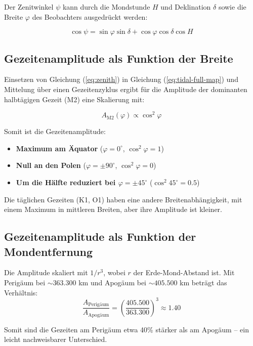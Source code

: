 \documentclass[12pt,a4paper]{article}
\theoremstyle{remark}
\begin{document}
	Der Zenitwinkel \(\psi\) kann durch die Mondstunde \(H\) und Deklination \(\delta\) sowie die Breite \(\varphi\) des Beobachters ausgedrückt werden:
	
	\begin{equation}
		\cos\psi = \sin\varphi \sin\delta + \cos\varphi \cos\delta \cos H
		\label{eq:zenith}
	\end{equation}
	
	\subsection{Gezeitenamplitude als Funktion der Breite}
	
	Einsetzen von Gleichung (\ref{eq:zenith}) in Gleichung (\ref{eq:tidal-full-map}) und Mittelung über einen Gezeitenzyklus ergibt für die Amplitude der dominanten halbtägigen Gezeit (M2) eine Skalierung mit:
	
	\begin{equation}
		A_{\text{M2}}(\varphi) \propto \cos^2\varphi
		\label{eq:amplitude-latitude}
	\end{equation}
	
	Somit ist die Gezeitenamplitude:
	\begin{itemize}
		\item \textbf{Maximum am Äquator} (\(\varphi = 0^\circ\), \(\cos^2\varphi = 1\))
		\item \textbf{Null an den Polen} (\(\varphi = \pm 90^\circ\), \(\cos^2\varphi = 0\))
		\item \textbf{Um die Hälfte reduziert bei \(\varphi = \pm 45^\circ\)} (\(\cos^2 45^\circ = 0.5\))
	\end{itemize}
	
	Die täglichen Gezeiten (K1, O1) haben eine andere Breitenabhängigkeit, mit einem Maximum in mittleren Breiten, aber ihre Amplitude ist kleiner.
	
	\subsection{Gezeitenamplitude als Funktion der Mondentfernung}
	
	Die Amplitude skaliert mit \(1/r^3\), wobei \(r\) der Erde-Mond-Abstand ist. Mit Perigäum bei \(\sim 363.300\) km und Apogäum bei \(\sim 405.500\) km beträgt das Verhältnis:
	\[
	\frac{A_{\text{Perigäum}}}{A_{\text{Apogäum}}} = \left(\frac{405.500}{363.300}\right)^3 \approx 1.40
	\]
	
	Somit sind die Gezeiten am Perigäum etwa 40\% stärker als am Apogäum – ein leicht nachweisbarer Unterschied.
	
\end{document}
